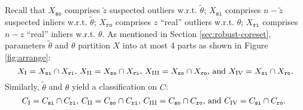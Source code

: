 Recall that $ X_{\mathtt{so}} $ comprises $ \tilde{z} $ suspected outliers w.r.t. $ \tilde{\theta} $; $ X_{\mathtt{si}} $ comprises $ n-\tilde{z} $ suspected inliers w.r.t. $ \tilde{\theta} $; $ X_{\mathtt{ro}} $ comprises $ z $ ``real'' outliers w.r.t. $ \theta $; $ X_{\mathtt{ri}} $ comprises $ n-z $ ``real'' inliers w.r.t. $ \theta $. As mentioned in Section \ref{sec:robust-coreset}, parameters $ \tilde{\theta} $ and $ \theta $ partition $ X $ into at most 4 parts as shown in Figure \ref{fig:arrange}:
\begin{equation}
\text{$ X_{\mathrm{\Rnum{1}}}=X_{\mathtt{si}}\cap X_{\mathtt{ri}}$, $ X_{\mathrm{\Rnum{2}}}=X_{\mathtt{so}}\cap X_{\mathtt{ri}}$, $ X_{\mathrm{\Rnum{3}}}=X_{\mathtt{so}}\cap X_{\mathtt{ro}}$, and $ X_{\mathrm{\Rnum{4}}}=X_{\mathtt{si}}\cap X_{\mathtt{ro}}$.}
\end{equation}
Similarly, $ \tilde{\theta} $ and $ \theta $ yield a classification on $ C $:
\begin{equation}
\text{$ C_{\mathrm{\Rnum{1}}}=C_{\mathtt{si}}\cap C_{\mathtt{ri}}$, $ C_{\mathrm{\Rnum{2}}}=C_{\mathtt{so}}\cap C_{\mathtt{ri}}$, $ C_{\mathrm{\Rnum{3}}}=C_{\mathtt{so}}\cap C_{\mathtt{ro}}$, and $ C_{\mathrm{\Rnum{4}}}=C_{\mathtt{si}}\cap C_{\mathtt{ro}}$. }
\end{equation}

